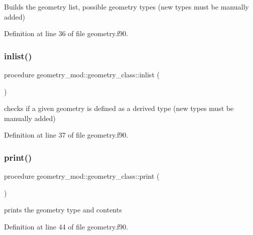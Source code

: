 Builds the geometry list, possible geometry types (new types must be manually added) 



Definition at line 36 of file geometry.\+f90.

\mbox{\label{structgeometry__mod_1_1geometry__class_a6dfcc19f822da875bebc58c3bf26e999}} 
\subsubsection{\texorpdfstring{inlist()}{inlist()}}
{\footnotesize\ttfamily procedure geometry\+\_\+mod\+::geometry\+\_\+class\+::inlist (\begin{DoxyParamCaption}{ }\end{DoxyParamCaption})\hspace{0.3cm}{\ttfamily [private]}}



checks if a given geometry is defined as a derived type (new types must be manually added) 



Definition at line 37 of file geometry.\+f90.

\mbox{\label{structgeometry__mod_1_1geometry__class_afbb83bea5cd3f73708b448d3c732ea7c}} 
\subsubsection{\texorpdfstring{print()}{print()}}
{\footnotesize\ttfamily procedure geometry\+\_\+mod\+::geometry\+\_\+class\+::print (\begin{DoxyParamCaption}{ }\end{DoxyParamCaption})\hspace{0.3cm}{\ttfamily [private]}}



prints the geometry type and contents 



Definition at line 44 of file geometry.\+f90.




